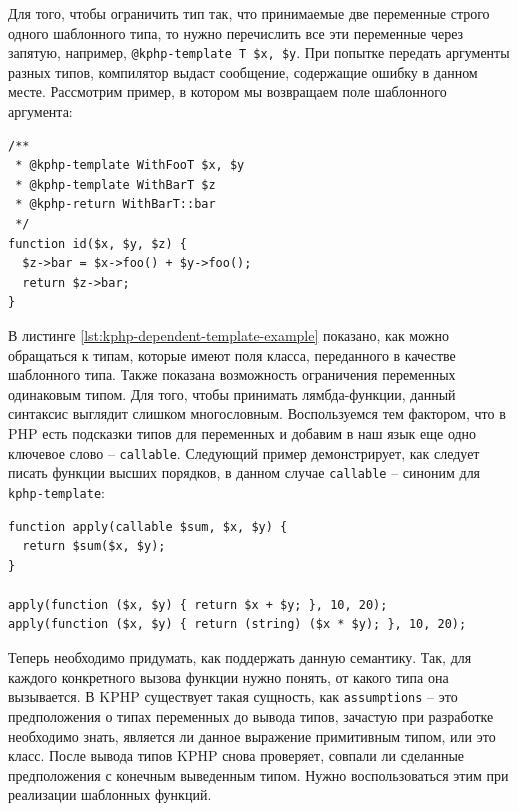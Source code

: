 Для того, чтобы ограничить тип так, что принимаемые две переменные строго одного шаблонного типа, то нужно перечислить все эти переменные через запятую, например, \verb|@kphp-template T $x, $y|.
При попытке передать аргументы разных типов, компилятор выдаст сообщение, содержащие ошибку в данном месте.
Рассмотрим пример, в котором мы возвращаем поле шаблонного аргумента:
\begin{lstlisting}[caption={Пример функции id, с применением шаблонов},label={lst:kphp-dependent-template-example}]
/**
 * @kphp-template WithFooT $x, $y
 * @kphp-template WithBarT $z
 * @kphp-return WithBarT::bar
 */
function id($x, $y, $z) {
  $z->bar = $x->foo() + $y->foo();
  return $z->bar;
}
\end{lstlisting}

В листинге \ref{lst:kphp-dependent-template-example} показано, как можно обращаться к типам, которые имеют поля класса, переданного в качестве шаблонного типа.
Также показана возможность ограничения переменных одинаковым типом.
Для того, чтобы принимать лямбда-функции, данный синтаксис выглядит слишком многословным.
Воспользуемся тем фактором, что в PHP есть подсказки типов для переменных и добавим в наш язык еще одно ключевое слово -- \verb|callable|.
Следующий пример демонстрирует, как следует писать функции высших порядков, в данном случае \verb|callable| -- синоним для \verb|kphp-template|:
\begin{lstlisting}[caption={Пример использования ключевого слова callable},label={lst:callable_support}]
function apply(callable $sum, $x, $y) {
  return $sum($x, $y);
}

apply(function ($x, $y) { return $x + $y; }, 10, 20);
apply(function ($x, $y) { return (string) ($x * $y); }, 10, 20);
\end{lstlisting}

Теперь необходимо придумать, как поддержать данную семантику.
Так, для каждого конкретного вызова функции нужно понять, от какого типа она вызывается.
В KPHP существует такая сущность, как \verb|assumptions| -- это предположения о типах переменных до вывода типов, зачастую при разработке необходимо знать, является ли данное выражение примитивным типом, или это класс.
После вывода типов KPHP снова проверяет, совпали ли сделанные предположения с конечным выведенным типом.
Нужно воспользоваться этим при реализации шаблонных функций.

